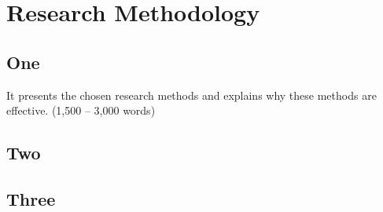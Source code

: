 
\chapter{Research Methodology}
\begin{spacing}{1.5}
\setlength{\parskip}{0.3in}


\section{One}

It presents the chosen research methods and explains why these methods are effective. (1,500 – 3,000 words)

\section{Two}


\section{Three}


\end{spacing}
\newpage
